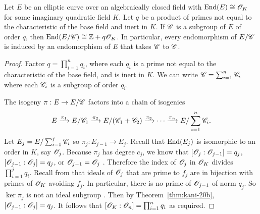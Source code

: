 \documentclass{amsart}
\begin{document}
\begin{lemma}\label{lem:c-end}
  Let $E$ be an elliptic curve over an algebraically closed field with $\operatorname{End}(E) \cong \mathscr{O}_K$ for some imaginary quadratic field $K$. Let $q$ be a product of primes not equal to the characteristic of the base field and inert in $K$. If $\mathscr{C}$ is a subgroup of $E$ of order $q$, then $\operatorname{End}(E/\mathscr{C}) \cong \mathbb{Z} + q\mathscr{O}_K$. In particular, every endomorphism of $E/\mathscr{C}$ is induced by an endomorphism of $E$ that takes $\mathscr{C}$ to $\mathscr{C}$.
\end{lemma}
\begin{proof}
  Factor $q = \prod_{i=1}^n q_i$, where each $q_i$ is a prime not equal to the characteristic of the base field, and is inert in $K$. We can write $\mathscr{C} = \sum_{i=1}^n \mathscr{C}_i$ where each $\mathscr{C}_i$ is a subgroup of order $q_i$.

  The isogeny $\pi: E \to E/\mathscr{C}$ factors into a chain of isogenies
  \[
    E
    \xrightarrow{\pi_1}
    E/\mathscr{C}_1
    \xrightarrow{\pi_2}
    E/(\mathscr{C}_1 + \mathscr{C}_2)
    \xrightarrow{\pi_3}
    \cdots
    \xrightarrow{\pi_n}
    E/\sum_{i=1}^n\mathscr{C}_i.
  \]
  Let $E_j = E/\sum_{i=1}^j\mathscr{C}_i$ so $\pi_j: E_{j-1} \to E_j$. Recall that $\operatorname{End}(E_j)$ is isomorphic to an order in $K$, say $\mathscr{O}_j$. Because $\pi_j$ has degree $c_j$, we know that $[\mathscr{O}_j : \mathscr{O}_{j-1}] = q_j$, $[\mathscr{O}_{j-1} : \mathscr{O}_j] = q_j$, or $\mathscr{O}_{j-1} = \mathscr{O}_j$ \cite[Prop.~5]{kohel1996endomorphism}. Therefore the index of $\mathscr{O}_j$ in $\mathscr{O}_K$ divides $\prod_{i=1}^{j}q_i$. Recall from \cite[Prop.~7.20]{cox2011primes} that ideals of $\mathscr{O}_j$ that are prime to $f_j$ are in bijection with primes of $\mathscr{O}_K$ avoiding $f_j$. In particular, there is no prime of $\mathscr{O}_{j-1}$ of norm $q_j$. So $\ker\pi_j$ is not an ideal subgroup \cite[Prop.~23]{kani2011products}. Then by Theorem~\ref{thm:kani-20b}, $[\mathscr{O}_{j-1} : \mathscr{O}_j] = q_j$. It follows that $[\mathscr{O}_K : \mathscr{O}_n] = \prod_{i=1}^n q_i$ as required.
\end{proof}
\end{document}
